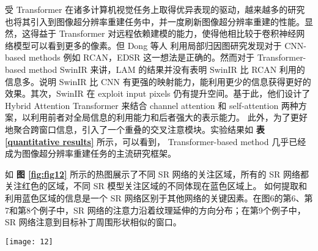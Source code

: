 受 Transformer 在诸多计算机视觉任务上取得优异表现的驱动，越来越多的研究也将其引入到图像超分辨率重建任务中，并一度刷新图像超分辨率重建的性能。显然，这得益于 Transformer 对远程依赖建模的能力，使得他相比较于卷积神经网络模型可以看到更多的像素。但 Dong 等人 \cite{DBLP:journals/corr/abs-2205-04437}利用局部归因图研究发现对于 CNN-based methods 例如 RCAN，EDSR 这一想法是正确的。然而对于 Transformer-based method SwinIR 来讲，LAM 的结果并没有表明 SwinIR 比 RCAN 利用的信息多。说明 SwinIR 比 CNN 有更强的映射能力，能利用更少的信息获得更好的效果。其次，SwinIR 在 exploit input pixels 仍有提升空间。基于此，他们设计了 Hybrid Attention Transformer 来结合 channel attention 和 self-attention 两种方案，以利用前者对全局信息的利用能力和后者强大的表示能力。 此外，为了更好地聚合跨窗口信息，引入了一个重叠的交叉注意模块。实验结果如 \textbf{表 \ref{quantitative results}} 所示，可以看到， Transformer-based method 几乎已经成为图像超分辨率重建任务的主流研究框架。

如 \textbf{图 \ref{fig:fig12}} 所示的热图展示了不同 SR 网络的关注区域，所有的 SR 网络都关注红色的区域，不同 SR 模型关注区域的不同体现在蓝色区域上。 如何提取和利用蓝色区域的信息是一个 SR 网络区别于其他网络的关键因素。在图6的第6、第7和第8个例子中，SR 网络的注意力沿着纹理延伸的方向分布；在第9个例子中，SR 网络注意到目标补丁周围形状相似的窗口。

\begin{figure*}[!htbp]
	\centering
	\texttt{[image: 12]}
	\caption{热图展示了不同 SR 网络的关注区域，所有 SR 网络都关注红色的区域，不同 SR 模型关注区域的不同体现在蓝色区域}
	\label{fig:fig12}
\end{figure*}


